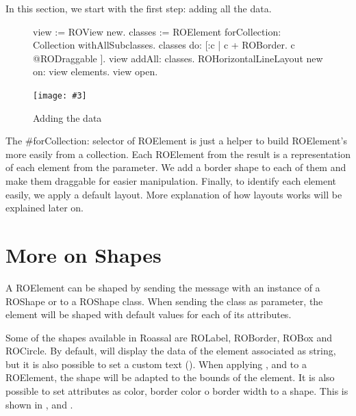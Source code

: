 \documentclass[a4paper,10pt,twoside]{book}
\newcommand{\fig}[4]{
		\begin{figure}[#1]
			\centering
			\texttt{[image: \#3]}
			\caption{\label{fig:#3}#4}
		\end{figure}}
\begin{document}
In this section, we start with the first step: adding all the data.
\begin{figure}[H]
\begin{code}{}
view := ROView new.
classes := ROElement forCollection: Collection withAllSubclasses.
classes 
	do: [:c | c + ROBorder.
			c @RODraggable ].
view addAll: classes.
ROHorizontalLineLayout new on: view elements.
view open.
\end{code}
\end{figure}

\fig{H}{0.6}{hier1}{Adding the data}

The \#forCollection: selector of ROElement is just a helper to build ROElement's more easily from a collection. Each ROElement from the result is a representation of each element from the parameter. We add a border shape to each of them and make them draggable for easier manipulation.
Finally, to identify each element easily, we apply a default layout. More explanation of how layouts works will be explained later on. 

%


\section{More on Shapes} 

A ROElement can be shaped by sending the \ct{+} message with an instance of a ROShape or to a ROShape class. When sending the class as parameter, the element will be shaped with default values for each of its attributes.

Some of the shapes available in Roassal are ROLabel, ROBorder, ROBox and ROCircle. By default,  will display the data of the element associated as string, but it is also possible to set a custom text (). When applying ,  and  to a ROElement, the shape will be adapted to the bounds of the element. It is also possible to set attributes as color, border color o border width to a shape. This is shown in ,  and .
\end{document}
